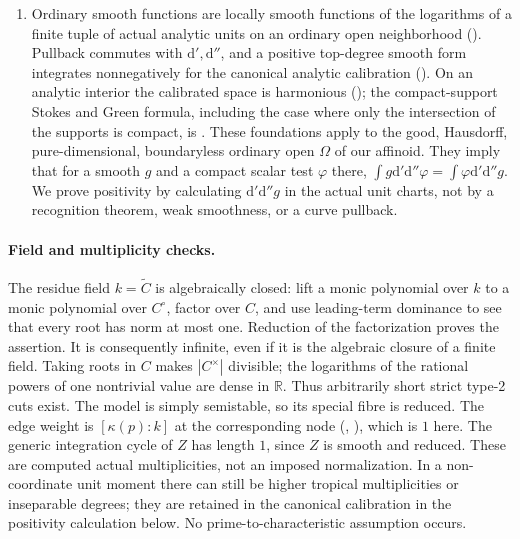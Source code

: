 \documentclass[11pt]{article}
\newcommand{\ddc}{\mathrm d'\mathrm d''}
\begin{document}
\begin{enumerate}
\item Ordinary smooth functions are locally smooth functions of the
logarithms of a finite tuple of actual analytic units on an ordinary
open neighborhood (\cite[Proposition 15.1.1(b) and Corollary 15.1.2]{CLD}).
Pullback commutes with $\mathrm d',\mathrm d''$, and a positive
top-degree smooth form integrates nonnegatively for the canonical
analytic calibration (\cite[\S7.3.1--7.3.4]{CLD}). On an analytic
interior the calibrated space is harmonious
(\cite[Theorem 15.6.1]{CLD}); the compact-support Stokes and Green
formula, including the case where only the intersection of the
supports is compact, is \cite[Proposition 5.11.1]{CLD}.
These foundations apply to the good, Hausdorff, pure-dimensional,
boundaryless ordinary open $\Omega$ of our affinoid. They imply that
for a smooth $g$ and a compact scalar test $\varphi$ there,
$\int g\ddc\varphi=\int\varphi\ddc g$.
We prove positivity by calculating $\ddc g$ in the actual unit charts,
not by a recognition theorem, weak smoothness, or a curve pullback.
\end{enumerate}

\paragraph{Field and multiplicity checks.}
The residue field $k=\widetilde C$ is algebraically closed: lift a monic
polynomial over $k$ to a monic polynomial over $C^\circ$, factor over
$C$, and use leading-term dominance to see that every root has norm
at most one. Reduction of the factorization proves the assertion.
It is consequently infinite, even if it is the algebraic closure of
a finite field. Taking roots in $C$ makes $|C^\times|$ divisible;
the logarithms of the rational powers of one nontrivial value are
dense in $\mathbb R$. Thus arbitrarily short strict type-2 cuts exist.
The model is simply semistable, so its special fibre is reduced.
The edge weight is $[\kappa(p):k]$ at the corresponding node
(\cite[\S2.2.3]{Thu}, \cite[15.2]{GJR}), which is $1$ here.
The generic integration cycle of $Z$ has length $1$, since $Z$ is
smooth and reduced. These are computed actual multiplicities, not
an imposed normalization. In a non-coordinate unit moment there can
still be higher tropical multiplicities or inseparable degrees;
they are retained in the canonical calibration in the positivity
calculation below. No prime-to-characteristic assumption occurs.
\end{document}

